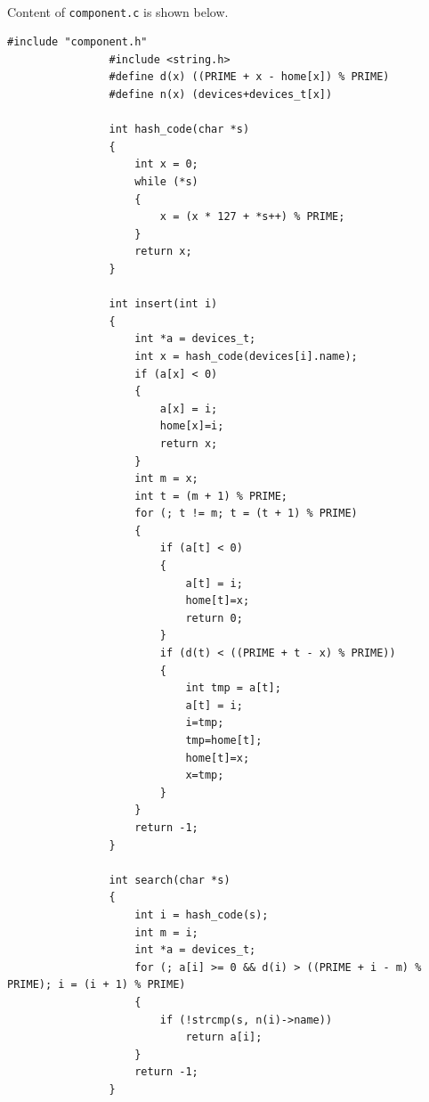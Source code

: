 \documentclass{article}
\begin{document}
            \paragraph{}
                Content of \texttt{component.c} is shown below.
            \begin{Verbatim}[gobble=8]
                #include "component.h"
                #include <string.h>
                #define d(x) ((PRIME + x - home[x]) % PRIME)
                #define n(x) (devices+devices_t[x])
                
                int hash_code(char *s)
                {
                    int x = 0;
                    while (*s)
                    {
                        x = (x * 127 + *s++) % PRIME;
                    }
                    return x;
                }
                
                int insert(int i)
                {
                    int *a = devices_t;
                    int x = hash_code(devices[i].name);
                    if (a[x] < 0)
                    {
                        a[x] = i;
                        home[x]=i;
                        return x;
                    }
                    int m = x;
                    int t = (m + 1) % PRIME;
                    for (; t != m; t = (t + 1) % PRIME)
                    {
                        if (a[t] < 0)
                        {
                            a[t] = i;
                            home[t]=x;
                            return 0;
                        }
                        if (d(t) < ((PRIME + t - x) % PRIME))
                        {
                            int tmp = a[t];
                            a[t] = i;
                            i=tmp;
                            tmp=home[t];
                            home[t]=x;
                            x=tmp;
                        }
                    }
                    return -1;
                }
                
                int search(char *s)
                {
                    int i = hash_code(s);
                    int m = i;
                    int *a = devices_t;
                    for (; a[i] >= 0 && d(i) > ((PRIME + i - m) % PRIME); i = (i + 1) % PRIME)
                    {
                        if (!strcmp(s, n(i)->name))
                            return a[i];
                    }
                    return -1;
                }
            \end{Verbatim}
\end{document}
